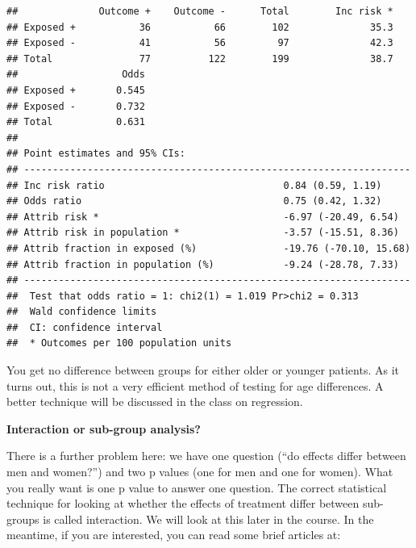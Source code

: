 \documentclass[]{book}
\newenvironment{Shaded}{\begin{snugshade}}{\end{snugshade}}
\newcommand{\CommentTok}[1]{\textcolor[rgb]{0.56,0.35,0.01}{\textit{#1}}}
\newcommand{\DataTypeTok}[1]{\textcolor[rgb]{0.13,0.29,0.53}{#1}}
\newcommand{\DecValTok}[1]{\textcolor[rgb]{0.00,0.00,0.81}{#1}}
\newcommand{\KeywordTok}[1]{\textcolor[rgb]{0.13,0.29,0.53}{\textbf{#1}}}
\newcommand{\NormalTok}[1]{#1}
\newcommand{\OperatorTok}[1]{\textcolor[rgb]{0.81,0.36,0.00}{\textbf{#1}}}
\begin{document}
\begin{Shaded}
\end{Shaded}

\begin{verbatim}
##              Outcome +    Outcome -      Total        Inc risk *
## Exposed +           36           66        102              35.3
## Exposed -           41           56         97              42.3
## Total               77          122        199              38.7
##                  Odds
## Exposed +       0.545
## Exposed -       0.732
## Total           0.631
## 
## Point estimates and 95% CIs:
## -------------------------------------------------------------------
## Inc risk ratio                               0.84 (0.59, 1.19)
## Odds ratio                                   0.75 (0.42, 1.32)
## Attrib risk *                                -6.97 (-20.49, 6.54)
## Attrib risk in population *                  -3.57 (-15.51, 8.36)
## Attrib fraction in exposed (%)               -19.76 (-70.10, 15.68)
## Attrib fraction in population (%)            -9.24 (-28.78, 7.33)
## -------------------------------------------------------------------
##  Test that odds ratio = 1: chi2(1) = 1.019 Pr>chi2 = 0.313
##  Wald confidence limits
##  CI: confidence interval
##  * Outcomes per 100 population units
\end{verbatim}

You get no difference between groups for either older or younger
patients. As it turns out, this is not a very efficient method of
testing for age differences. A better technique will be discussed in the
class on regression.

\textbf{Interaction or sub-group analysis?}

There is a further problem here: we have one question (``do effects
differ between men and women?'') and two p values (one for men and one
for women). What you really want is one p value to answer one question.
The correct statistical technique for looking at whether the effects of
treatment differ between sub-groups is called interaction. We will look
at this later in the course. In the meantime, if you are interested, you
can read some brief articles at:
\end{document}
